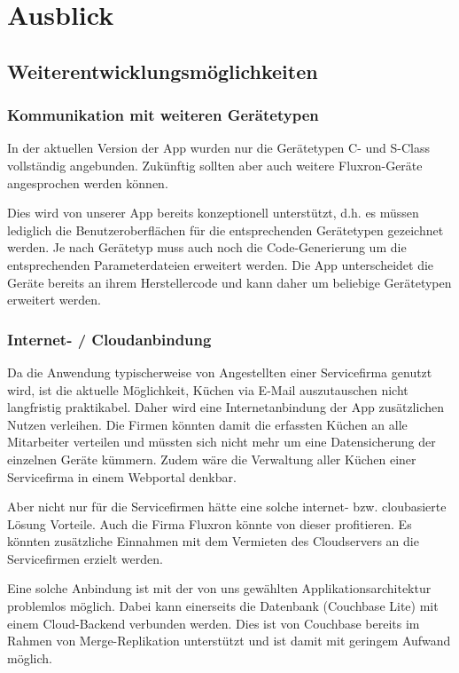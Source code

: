 \chapter{Ausblick}
\label{chap:Ausblick}

\section{Weiterentwicklungsmöglichkeiten}
\label{sec:Weiterentwicklungsmöglichkeiten}

\subsection{Kommunikation mit weiteren Gerätetypen}
\label{subsec:KommTypen}

In der aktuellen Version der App wurden nur die Gerätetypen C- und S-Class vollständig angebunden. Zukünftig sollten aber auch weitere Fluxron-Geräte angesprochen werden können.

Dies wird von unserer App bereits konzeptionell unterstützt, d.h. es müssen lediglich die Benutzeroberflächen für die entsprechenden Gerätetypen gezeichnet werden. Je nach Gerätetyp muss auch noch die Code-Generierung um die entsprechenden Parameterdateien erweitert werden. Die App unterscheidet die Geräte bereits an ihrem Herstellercode und kann daher um beliebige Gerätetypen erweitert werden.

\subsection{Internet- / Cloudanbindung}
\label{subsec:Internetanbindung}

Da die Anwendung typischerweise von Angestellten einer Servicefirma genutzt wird, ist die aktuelle Möglichkeit, Küchen via E-Mail auszutauschen nicht langfristig praktikabel. Daher wird eine Internetanbindung der App zusätzlichen Nutzen verleihen. Die Firmen könnten damit die erfassten Küchen an alle Mitarbeiter verteilen und müssten sich nicht mehr um eine Datensicherung der einzelnen Geräte kümmern. Zudem wäre die Verwaltung aller Küchen einer Servicefirma in einem Webportal denkbar.

Aber nicht nur für die Servicefirmen hätte eine solche internet- bzw. cloubasierte Lösung Vorteile. Auch die Firma Fluxron könnte von dieser profitieren. Es könnten zusätzliche Einnahmen mit dem Vermieten des Cloudservers an die Servicefirmen erzielt werden.

Eine solche Anbindung ist mit der von uns gewählten Applikationsarchitektur problemlos möglich. Dabei kann einerseits die Datenbank (Couchbase Lite) mit einem Cloud-Backend verbunden werden. Dies ist von Couchbase bereits im Rahmen von Merge-Replikation unterstützt und ist damit mit geringem Aufwand möglich.

